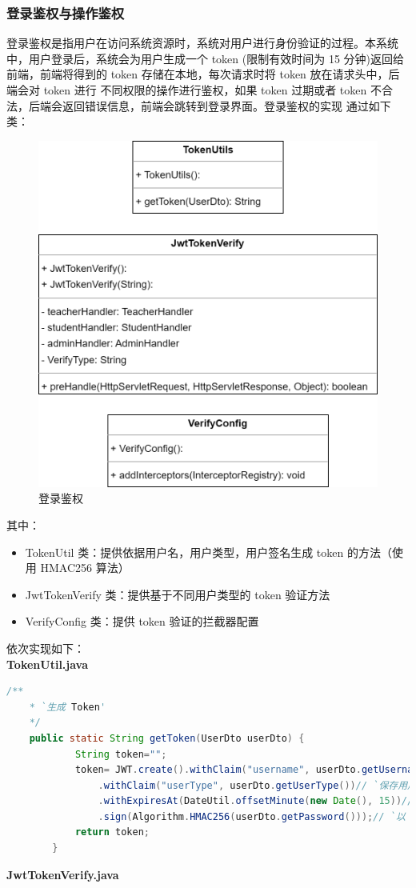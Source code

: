 \documentclass[12pt, a4paper]{article}
\begin{document}
\subsubsection{登录鉴权与操作鉴权}
登录鉴权是指用户在访问系统资源时，系统对用户进行身份验证的过程。本系统中，用户登录后，系统会为用户生成一个 token
(限制有效时间为 15 分钟)返回给前端，前端将得到的 token 存储在本地，每次请求时将 token 放在请求头中，后端会对 token 进行
不同权限的操作进行鉴权，如果 token 过期或者 token 不合法，后端会返回错误信息，前端会跳转到登录界面。登录鉴权的实现
通过如下类：
\begin{figure}[H]
  \centering
  \includegraphics[width = 0.5 \textwidth]{loginVerify.png}
  \caption{登录鉴权}
\end{figure}
其中：
\begin{itemize}
  \item TokenUtil 类：提供依据用户名，用户类型，用户签名生成 token 的方法（使用 HMAC256 算法）
  \item JwtTokenVerify 类：提供基于不同用户类型的 token 验证方法
  \item VerifyConfig 类：提供 token 验证的拦截器配置
\end{itemize}
依次实现如下：\\
\textbf{TokenUtil.java}
\begin{lstlisting}[language=Java]
	/**
	* `生成 Token'
	*/
	public static String getToken(UserDto userDto) {
			String token="";
			token= JWT.create().withClaim("username", userDto.getUsername())// `保存用户信息'
				.withClaim("userType", userDto.getUserType())// `保存用户信息'
				.withExpiresAt(DateUtil.offsetMinute(new Date(), 15))// `设置过期时间为 15 分钟'
				.sign(Algorithm.HMAC256(userDto.getPassword()));// `以 password 作为 token 的密钥'
			return token;
		}
\end{lstlisting}
\textbf{JwtTokenVerify.java}
\end{document}
